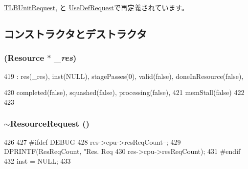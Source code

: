 \hyperlink{classTLBUnitRequest_af9d0c8a46736ba6aa2d8bb94da1a5e73}{TLBUnitRequest}, と \hyperlink{classUseDefUnit_1_1UseDefRequest_af9d0c8a46736ba6aa2d8bb94da1a5e73}{UseDefRequest}で再定義されています。

\subsection{コンストラクタとデストラクタ}
\hypertarget{classResourceRequest_ab5c79728c63623d1e0ede405fab39439}{
\subsubsection[{ResourceRequest}]{ ({\bf Resource} $\ast$ {\em \_\-res})}}
\label{classResourceRequest_ab5c79728c63623d1e0ede405fab39439}



\begin{DoxyCode}
419     : res(_res), inst(NULL), stagePasses(0), valid(false), doneInResource(false),
      
420       completed(false), squashed(false), processing(false),
421       memStall(false)
422 {
423 }
\end{DoxyCode}
\hypertarget{classResourceRequest_abd2569049d4e7c629ea3850d1878f00e}{
\subsubsection[{$\sim$ResourceRequest}]{\setlength{\rightskip}{0pt plus 5cm}$\sim${\bf ResourceRequest} ()}}
\label{classResourceRequest_abd2569049d4e7c629ea3850d1878f00e}



\begin{DoxyCode}
426 {
427 #ifdef DEBUG
428         res->cpu->resReqCount--;
429         DPRINTF(ResReqCount, "Res. Req %
430                 res->cpu->resReqCount);
431 #endif
432         inst = NULL;
433 }
\end{DoxyCode}


